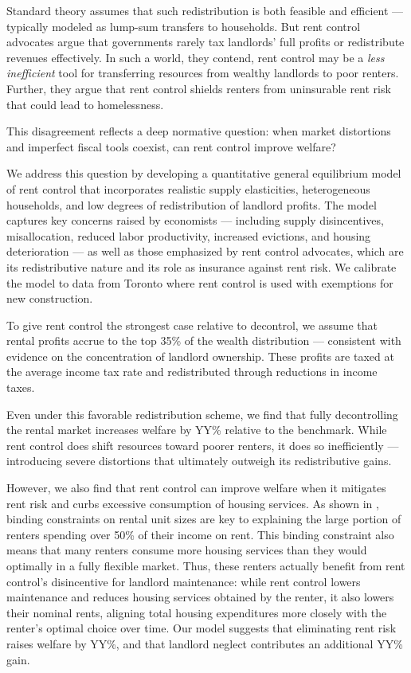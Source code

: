 \documentclass[parskip=full]{article}
\begin{document}
Standard theory assumes that such redistribution is both feasible and efficient — typically modeled as lump-sum transfers to households. But rent control advocates argue that governments rarely tax landlords’ full profits or redistribute revenues effectively. In such a world, they contend, rent control may be a \textsl{less inefficient} tool for transferring resources from wealthy landlords to poor renters. Further, they argue that rent control shields renters from uninsurable rent risk that could lead to homelessness. 

This disagreement reflects a deep normative question: when market distortions and imperfect fiscal tools coexist, can rent control improve welfare?

We address this question by developing a quantitative general equilibrium model of rent control that incorporates realistic supply elasticities, heterogeneous households, and low degrees of redistribution of landlord profits. The model captures key concerns raised by economists — including supply disincentives, misallocation, reduced labor productivity, increased evictions, and housing deterioration — as well as those emphasized by rent control advocates, which are its redistributive nature and its role as insurance against rent risk. We calibrate the model to data from Toronto where rent control is used with exemptions for new construction.

To give rent control the strongest case relative to decontrol, we assume that rental profits accrue to the top 35\% of the wealth distribution — consistent with evidence on the concentration of landlord ownership. These profits are taxed at the average income tax rate and redistributed through reductions in income taxes.

Even under this favorable redistribution scheme, we find that fully decontrolling the rental market increases welfare by YY\% relative to the benchmark. While rent control does shift resources toward poorer renters, it does so inefficiently — introducing severe distortions that ultimately outweigh its redistributive gains.

However, we also find that rent control can improve welfare when it mitigates rent risk and curbs excessive consumption of housing services. As shown in \citet{rs-2023}, binding constraints on rental unit sizes are key to explaining the large portion of renters spending over 50\% of their income on rent. This binding constraint also means that many renters consume more housing services than they would optimally in a fully flexible market. Thus, these renters actually benefit from rent control's disincentive for landlord maintenance: while rent control lowers maintenance and reduces housing services obtained by the renter, it also lowers their nominal rents, aligning total housing expenditures more closely with the renter's optimal choice over time. Our model suggests that eliminating rent risk raises welfare by YY\%, and that landlord neglect contributes an additional YY\% gain.
\end{document}
